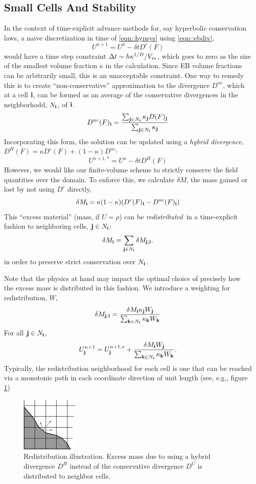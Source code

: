 \subsection{Small Cells And Stability}

In the context of time-explicit advance methods for, say hyperbolic conservation laws, 
a naive discretization in time of \ref{eqn::hypsys} using \ref{eqn::ebdiv},
$$
U^{n+1} = U^{n} - \delta t D^c(F)
$$
would have a time step constraint $\Delta t \sim h \kappa^{1/D}/V_m$,  which
goes to zero as the size of the 
smallest volume fraction $\kappa$ in the calculation.  Since EB volume fractions can
be arbitrarily small, this is an unacceptable constraint.  One way to remedy
this is to create ``non-conservative'' approximation to the divergence
$D^{nc}$, which at a cell ${\bf i}$, can be formed as an average of the conservative
divergences in the neighborhodd, $N_{\bf i}$, of ${\bf i}$.
$$
D^{nc}(F)_{\bf i} = \frac{\sum_{{\bf j} \in N_{\bf i}}\kappa_{\bf j} D(F)_{\bf j}}{\sum_{{\bf j} \in N_{\bf i}}\kappa_{\bf j}}
$$
Incorporating this form, the solution can be updated using a {\it hybrid divergence},
$D^H(F) = \kappa D^c(F) + (1-\kappa)D^{nc}$:
$$
U^{n+1,*} = U^n - \delta t D^H(F)
$$
However, we would like our finite-volume scheme to strictly conserve the field quantities
over the domain.  To enforce this, we calculate $\delta M$, the mass gained or
lost by not using $D^c$ directly,
$$
\delta M_{\bf i} = \kappa (1-\kappa)(D^c(F)_{\bf i} - D^{nc}(F)_{\bf i})
$$
This ``excess material'' (mass, if $U=\rho$) can be {\em redistributed}\ in a time-explicit fashion
to neighboring cells, ${\bf j} \in N_{\bf i}$:
$$
\delta M_{\bf i} = \sum_{{\bf j} \in N_{\bf i}} \delta M_{{\bf j}, {\bf i}}.
$$
in order to preserve strict conservation over $N_{\bf i}$.

Note that the physics at hand may impact the optimal choice of precisely how the excess mass is distributed
in this fashion.  We introduce a weighting for redistribution, $W$,
\begin{equation}
\delta M_{{\bf j}, {\bf i}} =  \frac{\delta M_{\bf i} \kappa_{\bf j}
  W_{\bf j}}{\sum_{{\bf k} \in N_{\bf i}} \kappa_{\bf k} W_{\bf k}}
\label{eqn::massweight}
\end{equation}
For all ${\bf j} \in N_{\bf i}$,
$$
U^{n+1}_{\bf j} = U^{n+1,*}_{\bf j} + 
 \frac{\delta M_{\bf i}
  W_{\bf j}}{\sum_{{\bf k} \in N_{\bf i}} \kappa_{\bf k} W_{\bf k}}.
$$
 Typically, the redistribution neighborhood for each cell is one that can be reached via a monotonic
 path in each coordinate direction of unit length
(see, e.g., figure \ref{fig::redistribution})
\begin{figure}[h]
  \centering
  \includegraphics[width=0.25\textwidth]{./EB/redist.pdf}
\caption{\label{fig::redistribution}
Redistribution illustration.  Excess mass due to using a hybrid
divergence $D^H$ instead of the conservative divergence $D^C$ is
distributed to neighbor cells.}
\end{figure}

